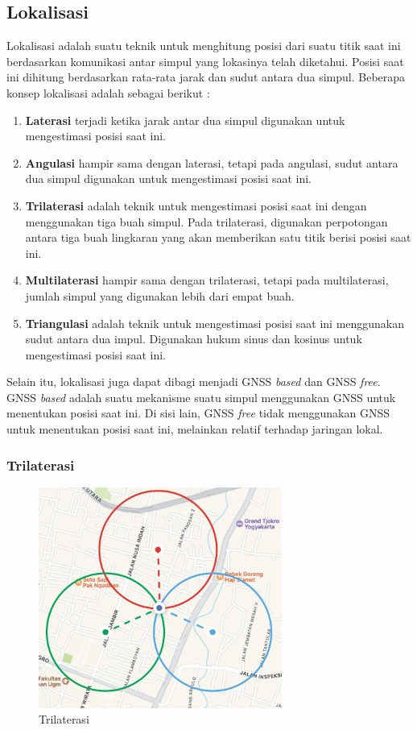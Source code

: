 \subsection{Lokalisasi}
Lokalisasi adalah suatu teknik untuk menghitung posisi dari suatu titik saat ini berdasarkan komunikasi antar simpul yang lokasinya telah diketahui. Posisi saat ini dihitung berdasarkan rata-rata jarak dan sudut antara dua simpul. Beberapa konsep lokalisasi adalah sebagai berikut \cite{Alrajeh2013}:

\begin{enumerate}
	\item \textbf{Laterasi} terjadi ketika jarak antar dua simpul digunakan untuk mengestimasi posisi saat ini.
	\item \textbf{Angulasi} hampir sama dengan laterasi, tetapi pada angulasi, sudut antara dua simpul digunakan untuk mengestimasi posisi saat ini.
	\item \textbf{Trilaterasi} adalah teknik untuk mengestimasi posisi saat ini dengan menggunakan tiga buah simpul. Pada trilaterasi, digunakan perpotongan antara tiga buah lingkaran yang akan memberikan satu titik berisi posisi saat ini.
	\item \textbf{Multilaterasi} hampir sama dengan trilaterasi, tetapi pada multilaterasi, jumlah simpul yang digunakan lebih dari empat buah.
	\item \textbf{Triangulasi} adalah teknik untuk mengestimasi posisi saat ini menggunakan sudut antara dua impul. Digunakan hukum sinus dan kosinus untuk mengestimasi posisi saat ini.
\end{enumerate}

Selain itu, lokalisasi juga dapat dibagi menjadi GNSS \textit{based} dan GNSS \textit{free}. GNSS \textit{based} adalah suatu mekanisme suatu simpul menggunakan GNSS untuk menentukan posisi saat ini. Di sisi lain, GNSS \textit{free} tidak menggunakan GNSS untuk menentukan posisi saat ini, melainkan relatif terhadap jaringan lokal.

\subsubsection{Trilaterasi}
\begin{figure}[H]
	\centering
	\includegraphics[width=8cm]{contents/chapter-2/trilaterasi.png}
	\caption{Trilaterasi}
	\label{Fig: Trilaterasi}
\end{figure}


